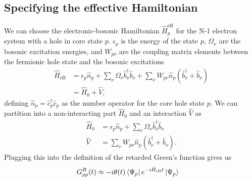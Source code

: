 \subsection{Specifying the effective Hamiltonian}
We can choose the electronic-bosonic Hamiltonian $\hat{H}_p^{\text{eB}}$ for the N-1 electron system with a hole in core state $p$. $\epsilon_p$ is the energy of the state $p$, $\Omega_\nu$ are the bosonic excitation energies, and $W_{p\nu}$ are the coupling matrix elements between the fermionic hole state and the bosonic excitations
\begin{align}
    \hat{H}_{\text{eB}} &= \epsilon_{p} \hat{n}_p + \sum_{\nu} \Omega_{\nu} \hat{b}_\nu^\dagger \hat{b}_\nu + \sum_{\nu} W_{p\nu} \hat{n}_p \left( \hat{b}_\nu^\dagger + \hat{b}_\nu \right) \\
    & = \hat{H}_0 + \hat{V},
\end{align}
defining $\hat{n}_p = \hat{c}_p^\dagger \hat{c}_p$ as the number operator for the core hole state $p$. 
We can partition into a non-interacting part $\hat{H}_0$ and an interaction $\hat{V}$ as
\begin{align}
    \hat{H}_0 &= \epsilon_{p} \hat{n}_p + \sum_{\nu} \Omega_{\nu} \hat{b}_\nu^\dagger \hat{b}_\nu \\
    \hat{V} &= \sum_{\nu} W_{p\nu} \hat{n}_p \left( \hat{b}_\nu^\dagger + \hat{b}_\nu \right).
\end{align}
Plugging this into the definition of the retarded Green's function gives us
\begin{align}
G_{pp}^R(t) &\approx -i \theta(t) \bra{\Psi_p} e^{-i\hat{H}_{\text{eB}} t} \ket{\Psi_p}
\end{align}
